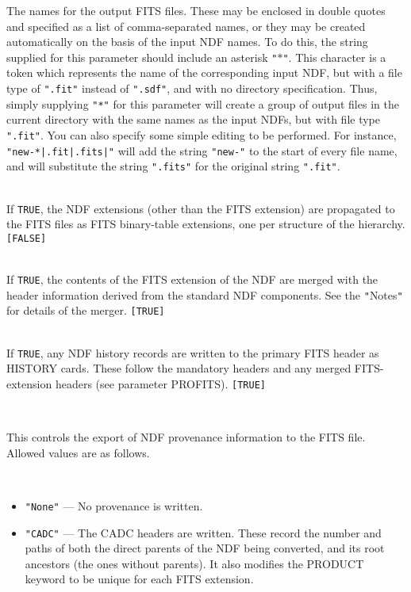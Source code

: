 \documentclass[twoside,11pt]{article}
\newcommand{\latex}[1]{#1}
\newcommand{\sstsubsection}[1]{ \item[{#1}] \mbox{} \\}
\newcommand{\ssthitemlist}[1]{
  \latex{
  \mbox{} \\
  \vspace{-3.5ex}
  }
  \begin{itemize}
     #1
  \end{itemize}
}
\newcommand{\sstitem}{\item}
\newcommand{\sstsubsection}[1]{\item[{#1}]}
\newcommand{\sstitem}{\item}
\begin{document}
{{{      }{
         The names for the output FITS files.  These may be enclosed in double
         quotes and specified as a list of comma-separated names, or they may
         be created automatically on the basis of the input NDF names. To do
         this, the string supplied for this parameter should include an
         asterisk \texttt{"$*$"}. This character is a token which represents
         the name of the corresponding input NDF, but with a file type of
         \texttt{".fit"} instead of \texttt{".sdf"}, and with no directory
         specification. Thus, simply supplying \texttt{"*"} for this parameter
         will create a group of output files in the current directory with the 
         same names as the input NDFs, but with file type \texttt{".fit"}. 
         You can also specify some simple editing to be performed. For instance,
         \texttt{"new-*|.fit|.fits|"} will add the string \texttt{"new-"} to
         the start of every file name, and will substitute the string
         \texttt{".fits"} for the original string \texttt{".fit"}.
      }
      \sstsubsection{
         PROEXTS = \_LOGICAL (Read)
      }{
         If \texttt{TRUE}, the NDF extensions (other than the FITS extension)
         are propagated to the FITS files as FITS binary-table
         extensions, one per structure of the hierarchy. \texttt{[FALSE]}
      }
      \sstsubsection{
         PROFITS = \_LOGICAL (Read)
      }{
         If \texttt{TRUE}, the contents of the FITS extension of the NDF are
         merged with the header information derived from the standard
         NDF components.  See the \texttt{"}Notes\texttt{"} for details of the merger.
         \texttt{[TRUE]}
      }
      \sstsubsection{
         PROHIS = \_LOGICAL (Read)
      }{
         If \texttt{TRUE}, any NDF history records are written to the primary
         FITS header as HISTORY cards.  These follow the mandatory
         headers and any merged FITS-extension headers (see parameter
         PROFITS). \texttt{[TRUE]}
      }
      \sstsubsection{
         PROVENANCE = LITERAL (Read)
      }{
         This controls the export of NDF provenance information to the 
         FITS file.  Allowed values are as follows.
         \ssthitemlist{

            \sstitem  
            \texttt{"None"} --- No provenance is written.

            \sstitem
            \texttt{"CADC"} --- The CADC headers are written.  These
	    record the number and paths of both the direct parents
	    of the NDF being converted, and its root ancestors (the
	    ones without parents).  It also modifies the PRODUCT 
            keyword to be unique for each FITS extension.
 
}}}}
\end{document}
